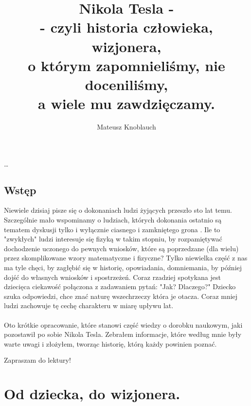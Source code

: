 \documentclass{article}
\title{
Nikola Tesla -\\- czyli historia człowieka, wizjonera, \\o którym zapomnieliśmy, nie doceniliśmy,\\a wiele mu zawdzięczamy.}
\author{Mateusz Knoblauch}
\begin{document}
\begin{Huge}
\maketitle
\end{Huge}


\newpage


\begin{center}

\tableofcontents

\ldots{}

\end{center}


\newpage

\begin{Huge}
\section{Wstęp}
\end{Huge}

\begin{large}

Niewiele dzisiaj pisze się o dokonaniach ludzi żyjących przeszło sto lat temu. Szczególnie mało wspominamy o ludziach, których dokonania ostatnio są tematem dyskusji tylko i wyłącznie ciasnego i zamkniętego grona . Ile to "zwykłych" ludzi interesuje się fizyką w takim stopniu, by rozpamiętywać dochodzenie uczonego do pewnych wniosków, które są poprzedzane (dla wielu) przez skomplikowane wzory matematyczne i fizyczne? Tylko niewielka część z nas ma tyle chęci, by zagłębić się w historię, opowiadania, domniemania, by później dojść do własnych wniosków i spostrzeżeń. Coraz rzadziej spotykana jest dziecięca ciekawość połączona z  zadawaniem pytań: "Jak? Dlaczego?" Dziecko szuka odpowiedzi, chce znać naturę wszechrzeczy która je otacza. Coraz mniej ludzi zachowuje tę cechę charakteru w miarę upływu lat.
\\
\\

\indent Oto krótkie opracowanie, które stanowi część wiedzy o dorobku naukowym, jaki pozostawił po sobie Nikola Tesla. Zebrałem informacje, które według mnie były warte uwagi i złożyłem, tworząc historię, którą każdy powinien poznać.

\indent Zapraszam do lektury!

\end{large}


\newpage


\section{Od dziecka, do wizjonera.}
\end{document}
